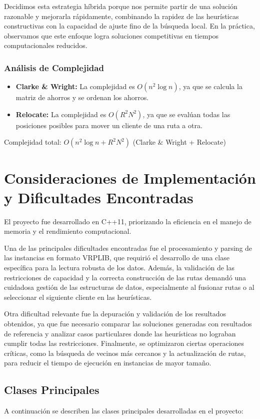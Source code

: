 \documentclass[a4paper,12pt]{article}
\begin{document}
Decidimos esta estrategia híbrida porque nos permite partir de una solución razonable y mejorarla rápidamente, combinando la rapidez de las heurísticas constructivas con la capacidad de ajuste fino de la búsqueda local. En la práctica, observamos que este enfoque logra soluciones competitivas en tiempos computacionales reducidos.
\subsubsection{Análisis de Complejidad}
    \begin{itemize}
        \item \textbf{Clarke \& Wright:} La complejidad es $O(n^2 \log n)$, ya que se calcula la matriz de ahorros y se ordenan los ahorros.
        \item \textbf{Relocate:} La complejidad es $O(R^2 N^2)$, ya que se evalúan todas las posiciones posibles para mover un cliente de una ruta a otra.
    \end{itemize}
    Complejidad total: $O(n^2 \log n + R^2 N^2)$ (Clarke \& Wright + Relocate)

\section{Consideraciones de Implementación y Dificultades Encontradas}

El proyecto fue desarrollado en C++11, priorizando la eficiencia en el manejo de memoria y el rendimiento computacional.

Una de las principales dificultades encontradas fue el procesamiento y parsing de las instancias en formato VRPLIB, que requirió el desarrollo de una clase específica para la lectura robusta de los datos. Además, la validación de las restricciones de capacidad y la correcta construcción de las rutas demandó una cuidadosa gestión de las estructuras de datos, especialmente al fusionar rutas o al seleccionar el siguiente cliente en las heurísticas.

Otra dificultad relevante fue la depuración y validación de los resultados obtenidos, ya que fue necesario comparar las soluciones generadas con resultados de referencia y analizar casos particulares donde las heurísticas no lograban cumplir todas las restricciones. Finalmente, se optimizaron ciertas operaciones críticas, como la búsqueda de vecinos más cercanos y la actualización de rutas, para reducir el tiempo de ejecución en instancias de mayor tamaño.

\subsection{Clases Principales}
A continuación se describen las clases principales desarrolladas en el proyecto:
\end{document}
